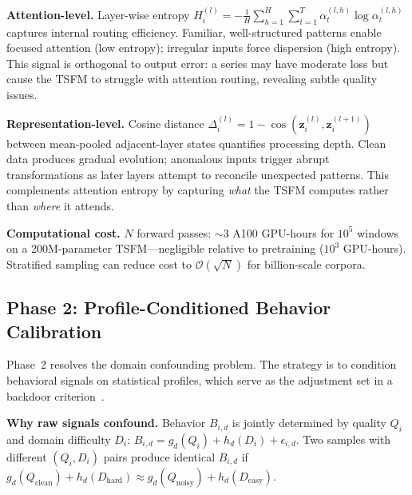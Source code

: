 \documentclass{article}
\begin{document}
\textbf{Attention-level.} Layer-wise entropy $H_i^{(l)} = -\frac{1}{H}\sum_{h=1}^{H}\sum_{t=1}^{T} \alpha_{t}^{(l,h)} \log \alpha_{t}^{(l,h)}$ captures internal routing efficiency. Familiar, well-structured patterns enable focused attention (low entropy); irregular inputs force dispersion (high entropy). This signal is orthogonal to output error: a series may have moderate loss but cause the TSFM to struggle with attention routing, revealing subtle quality issues.

\textbf{Representation-level.} Cosine distance $\Delta_i^{(l)} = 1 - \cos(\mathbf{z}_i^{(l)}, \mathbf{z}_i^{(l+1)})$ between mean-pooled adjacent-layer states quantifies processing depth. Clean data produces gradual evolution; anomalous inputs trigger abrupt transformations as later layers attempt to reconcile unexpected patterns. This complements attention entropy by capturing \emph{what} the TSFM computes rather than \emph{where} it attends.

\textbf{Computational cost.} $N$ forward passes: $\sim$3 A100 GPU-hours for $10^5$ windows on a 200M-parameter TSFM---negligible relative to pretraining ($10^3$ GPU-hours). Stratified sampling can reduce cost to $\mathcal{O}(\sqrt{N})$ for billion-scale corpora.

\subsection{Phase 2: Profile-Conditioned Behavior Calibration}
\label{sec:calibration}

Phase~2 resolves the domain confounding problem. The strategy is to condition behavioral signals on statistical profiles, which serve as the adjustment set in a backdoor criterion~\citep{pearl2009causality}.

\textbf{Why raw signals confound.} Behavior $B_{i,d}$ is jointly determined by quality $Q_i$ and domain difficulty $D_i$: $B_{i,d} = g_d(Q_i) + h_d(D_i) + \epsilon_{i,d}$. Two samples with different $(Q_i, D_i)$ pairs produce identical $B_{i,d}$ if $g_d(Q_{\text{clean}}) + h_d(D_{\text{hard}}) \approx g_d(Q_{\text{noisy}}) + h_d(D_{\text{easy}})$.
\end{document}
